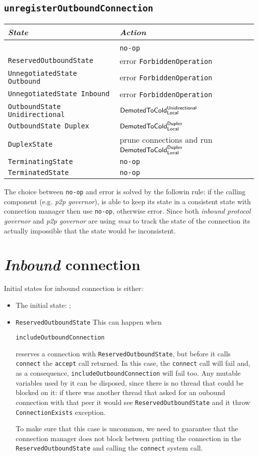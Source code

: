 \documentclass{article}
\def\InitialState{\textbullet}
\def\ReservedOutboundState{\texttt{ReservedOutboundState}}
\def\UnnegotiatedStateOut{\texttt{UnnegotiatedState Outbound}}
\def\UnnegotiatedStateIn{\texttt{UnnegotiatedState Inbound}}
\def\OutboundStateUni{\texttt{OutboundState Unidirectional}}
\def\OutboundStateDup{\texttt{OutboundState Duplex}}
\def\DuplexState{\texttt{DuplexState}}
\def\TerminatingState{\texttt{TerminatingState}}
\def\TerminatedState{\texttt{TerminatedState}}
\def\DemotedToColdDupLoc{$\text{\textsf{DemotedToCold}}^\text{\textsf{Duplex}}_\text{\textsf{Local}}$}
\def\DemotedToColdUniLoc{$\text{\textsf{DemotedToCold}}^\text{\textsf{Unidirectional}}_\text{\textsf{Local}}$}
\def\ptopgov{\textit{p2p governor}}
\def\mux{\textit{mux}}
\def\inbgov{\textit{inbound protocol governor}}
\begin{document}
\subsection{\texttt{unregisterOutboundConnection}}
\begin{tabular}[h]{ll}
  \textit{State}           & \textit{Action} \\\hline\\[2pt]
  \InitialState{}          & \texttt{no-op} \\[8pt]
  \ReservedOutboundState{} & error \texttt{ForbiddenOperation} \\[8pt]
  \UnnegotiatedStateOut{}  & error \texttt{ForbiddenOperation} \\[8pt]
  \UnnegotiatedStateIn{}   & error \texttt{ForbiddenOperation} \\[8pt]
  \OutboundStateUni{}      & \DemotedToColdUniLoc{} \\[8pt]
  \OutboundStateDup{}      & \DemotedToColdDupLoc{} \\[8pt]
  \DuplexState{}           & prune connections and run \DemotedToColdDupLoc{} \\[8pt]
  \TerminatingState{}      & \texttt{no-op} \\[8pt]
  \TerminatedState{}       & \texttt{no-op} \\[8pt]
\end{tabular}
The choice between \texttt{no-op} and error is solved by the followin rule: if
the calling component (e.g. \ptopgov{}), is able to keep its state in
a consistent state with connection manager then use \texttt{no-op}, otherwise
error.  Since both \inbgov{} and \ptopgov{} are using \mux{} to track the state
of the connection its actually impossible that the state would be inconsistent.

\section{\textit{Inbound} connection}
Initial states for inbound connection is either:
\begin{itemize}
  \item The initial state: \InitialState{};
  \item \ReservedOutboundState{}
    This can happen when
    \begin{center}
      \texttt{includeOutboundConnection}
    \end{center}
    reserves a connection with \ReservedOutboundState{}, but before it calls
    \texttt{connect} the \texttt{accept} call returned.  In this case, the
    \texttt{connect} call will fail and, as a consequence,
    \texttt{includeOutboundConnection} will fail too.  Any mutable variables
    used by it can be disposed, since there is no thread that could be blocked
    on it: if there was another thread that asked for an oubound connection
    with that peer it would see \ReservedOutboundState{} and it throw
    \texttt{ConnectionExists} exception.

    To make sure that this case is uncommon, we need to guarantee that the
    connection manager does not block between putting the connection in the
    \ReservedOutboundState{} and calling the \texttt{connect} system call.
\end{itemize}
\end{document}
